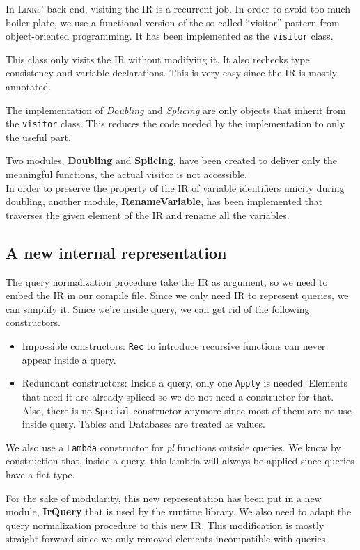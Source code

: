 \documentclass[11pt]{article}
\newcommand\mysc[1]{{\rmfamily\textsc{#1}}\xspace}
\newcommand\links{\mysc{Links}}
\newcommand\effect[1]{{\em #1}}
\newcommand\ocamlc[1]{\lstinline[language={[Objective]Caml},basicstyle=\ttfamily\normalsize]{#1}}
\newcommand\module[1]{{\bf #1}}
\begin{document}
In \links' back-end, visiting the IR is a recurrent job. In order to avoid too much boiler plate, we use a functional version of the so-called ``visitor'' pattern from object-oriented programming. It has been implemented as the \ocamlc{visitor} class.

This class only visits the IR without modifying it. It also rechecks type consistency and variable declarations. This is very easy since the IR is mostly annotated.

The implementation of \emph{Doubling} and \emph{Splicing} are only objects that inherit from the \ocamlc{visitor} class. This reduces the code needed by the implementation to only the useful part.

Two modules, \module{Doubling} and \module{Splicing}, have been created to deliver only the meaningful functions, the actual visitor is not accessible.\\
In order to preserve the property of the IR of variable identifiers unicity during doubling, another module, \module{RenameVariable}, has been implemented that traverses the given element of the IR and rename all the variables.

\subsection{A new internal representation}

The query normalization procedure take the IR as argument, so we need to embed the IR in our compile file. Since we only need IR to represent queries, we can simplify it. Since we're inside query, we can get rid of the following constructors.
\begin{itemize}
\item Impossible constructors: \ocamlc{Rec} to introduce recursive functions can never appear inside a query.
\item Redundant constructors: Inside a query, only one \ocamlc{Apply} is needed. Elements that need it are already spliced so we do not need a constructor for that. Also, there is no \ocamlc{Special} constructor anymore since most of them are no use inside query. Tables and Databases are treated as values.
\end{itemize}

We also use a \ocamlc{Lambda} constructor for \effect{pl} functions outside queries. We know by construction that, inside a query, this lambda will always be applied since queries have a flat type.

For the sake of modularity, this new representation has been put in a new module, \module{IrQuery} that is used by the runtime library. We also need to adapt the query normalization procedure to this new IR. This modification is mostly straight forward since we only removed elements incompatible with queries.
\end{document}
